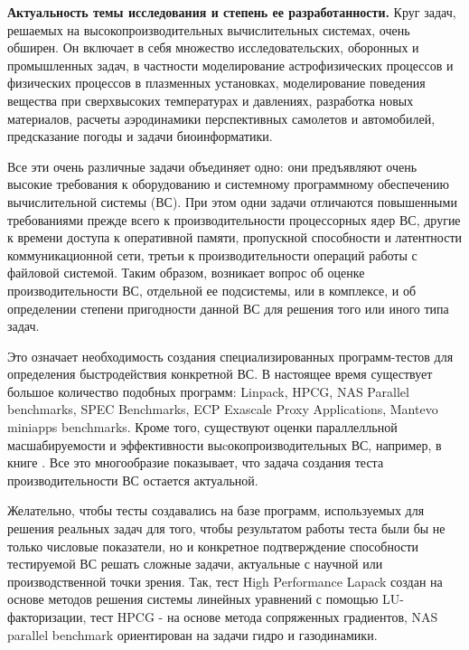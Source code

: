  \textbf{Актуальность темы исследования и степень ее
	разработанности.} Круг задач, решаемых на высокопроизводительных вычислительных системах, очень обширен. Он включает в себя множество исследовательских, оборонных и промышленных задач, в частности моделирование астрофизических процессов и физических процессов в плазменных установках, моделирование поведения вещества при сверхвысоких температурах и давлениях, разработка новых материалов, расчеты аэродинамики перспективных самолетов и автомобилей, предсказание погоды и задачи биоинформатики.

Все эти очень различные задачи объединяет одно: они предъявляют очень высокие требования к оборудованию и системному программному обеспечению вычислительной системы (ВС). При этом одни задачи  отличаются повышенными требованиями прежде всего к производительности процессорных ядер ВС, другие к времени доступа к оперативной памяти, пропускной способности и латентности коммуникационной сети, третьи к производительности операций работы с файловой системой. Таким образом, возникает вопрос об оценке производительности ВС, отдельной ее подсистемы, или в комплексе, и об определении степени пригодности данной ВС для решения того или иного типа задач. 

Это означает необходимость создания специализированных программ-тестов для определения быстродействия конкретной ВС. В настоящее время существует большое количество подобных программ: Linpack, HPCG, NAS Parallel benchmarks, SPEC Benchmarks, ECP Exascale Proxy Applications, Mantevo miniapps benchmarks. Кроме того, существуют оценки параллелльной масшабируемости и эффективности выcокопроизводительных ВС, например, в книге \cite{StepanenkoScaling}.
Все это многообразие показывает, что задача создания теста производительности ВС остается актуальной.


Желательно, чтобы тесты создавались на базе программ, используемых для решения реальных задач для того, чтобы результатом работы теста были бы не только числовые показатели, но и конкретное подтверждение способности тестируемой ВС решать сложные задачи, актуальные с научной или производственной точки зрения. Так, тест High Performance Lapack создан на основе методов решения системы линейных уравнений с помощью LU-факторизации, тест HPCG - на основе метода сопряженных градиентов, NAS parallel benchmark ориентирован на задачи гидро и газодинамики.



